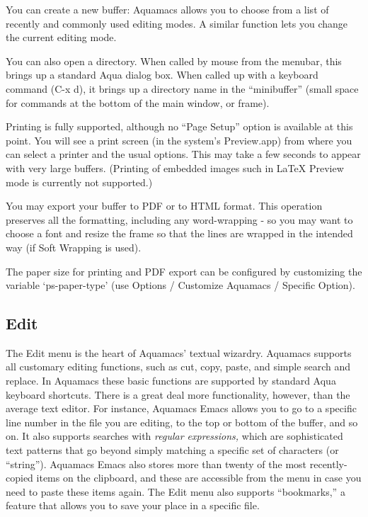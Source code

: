 \documentclass[11pt,letterpaper]{article}
\begin{document}
You can create a new buffer: Aquamacs allows you to choose from a list of recently and commonly used editing modes.  A similar function lets you change the current editing mode.

You can also open a directory. When called by mouse from the menubar, this brings up a standard Aqua dialog box. When called up with a keyboard command (C-x d), it brings up a directory name in the ``minibuffer'' (small space for commands at the bottom of the main window, or frame).

Printing is fully supported, although no ``Page Setup'' option is available at this point.  You will see a print screen (in the system's Preview.app) from where you can select a printer and the usual options.  This may take a few seconds to appear with very large buffers. (Printing of embedded images such in LaTeX Preview mode is currently not supported.)

You may export your buffer to PDF or to HTML format. This operation
preserves all the formatting, including any word-wrapping - so you may
want to choose a font and resize the frame so that the lines are
wrapped in the intended way (if Soft Wrapping is used).

The paper size for printing and PDF export can be configured by customizing the variable `ps-paper-type' (use Options / Customize Aquamacs / Specific Option).

\subsection{Edit}
The Edit menu is the heart of Aquamacs' textual wizardry. Aquamacs supports
all customary editing functions, such as cut, copy, paste, and simple
search and replace. In Aquamacs these basic functions are supported by
standard Aqua keyboard shortcuts. There is a great deal more
functionality, however, than the average text editor. For instance,
Aquamacs Emacs allows you to go to a specific line number in the file you are
editing, to the top or bottom of the buffer, and so on. It also supports searches with \textit{regular 
expressions,}
which are sophisticated text patterns that go beyond simply matching a
specific set of characters (or ``string''). Aquamacs Emacs also stores more
than twenty of the most recently-copied items on the clipboard, and
these are accessible from the menu in case you need to paste these
items again.  The Edit menu also supports ``bookmarks,'' a feature
that allows you to save your place in a specific file. 
\end{document}
